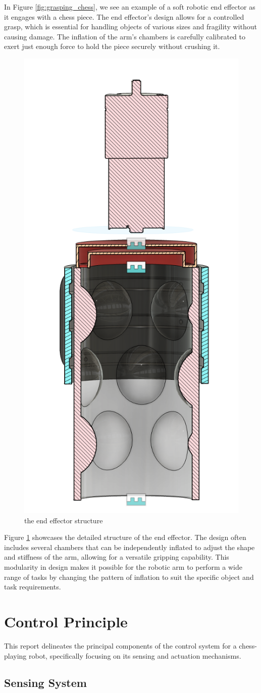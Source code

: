 \documentclass[10pt, a4paper, twocolumn]{article}
\begin{document}
In Figure \ref{fig:grasping_chess}, we see an example of a soft robotic end effector as it engages with a chess piece. The end effector's design allows for a controlled grasp, which is essential for handling objects of various sizes and fragility without causing damage. The inflation of the arm's chambers is carefully calibrated to exert just enough force to hold the piece securely without crushing it.

\begin{figure}
\centering
\includegraphics[width=0.3\linewidth]{end effector.png}
\caption{the end effector structure}
\label{fig:end_effector}
\end{figure}

Figure \ref{fig:end_effector} showcases the detailed structure of the end effector. The design often includes several chambers that can be independently inflated to adjust the shape and stiffness of the arm, allowing for a versatile gripping capability. This modularity in design makes it possible for the robotic arm to perform a wide range of tasks by changing the pattern of inflation to suit the specific object and task requirements.

\section{Control Principle}

This report delineates the principal components of the control system for a chess-playing robot, specifically focusing on its sensing and actuation mechanisms.

\subsection{Sensing System}
\end{document}
